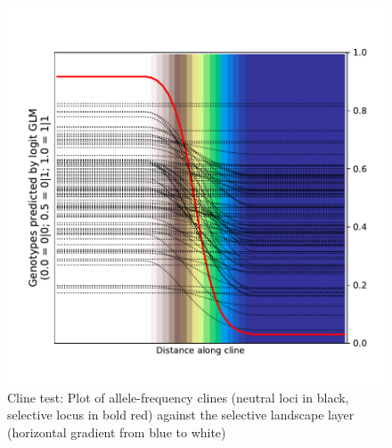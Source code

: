 ﻿\documentclass{article}
\begin{document}
\begin{figure}[ht!]
        \includegraphics[width=175mm]{./img/final/CLINE_fitted_clines.pdf}
        \caption{Cline test: Plot of allele-frequency clines
                 (neutral loci in black, selective locus in bold red)
                 against the selective landscape layer
                 (horizontal gradient from blue to white)}
        \label{fig:cline_fits}
\end{figure}
\end{document}
